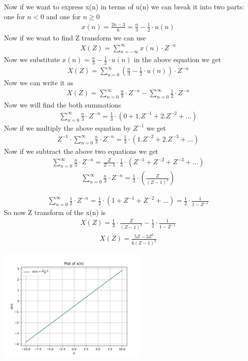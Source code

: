 \documentclass[journal,12pt,twocolumn]{IEEEtran}
\theoremstyle{remark}
\begin{document}
Now if we want to express x(n) in terms of u(n) we can break it into two parts: one for $n < 0 $ and one for $ n \ge 0$  
\begin{align} x(n) = \frac{2n-3}{6} = \frac{n}{3} - \frac{1}{2} \cdot u(n) \end{align}
\bigskip
Now if we want to find Z transform we can use
\begin{align} X(Z) = \sum_{n = -\infty}^{\infty} x(n) \cdot Z^{-n} \end{align}
\bigskip
Now we substitute
$x(n) = \frac{n}{3} - \frac{1}{2} \cdot u(n)$ in the above equation we get
\begin{align} X(Z) = \sum_{n = 0}^{\infty} (\frac{n}{3} - \frac{1}{2} \cdot u(n) )\cdot Z^{-n} \end{align}
\bigskip
Now we can write it as
\begin{align} X(Z) = \sum_{n=0}^{\infty} \frac{n}{3} \cdot Z^{-n} - \sum_{n=0}^{\infty} \frac{1}{2} \cdot Z^{-n} \end{align}
\bigskip
Now we will find the both summations
\begin{align} \sum_{n=0}^{\infty} \frac{n}{3} \cdot Z^{-n} = \frac{1}{3} \cdot (0 + 1.Z^{-1} + 2.Z^{-2} + \ldots) \end{align}
\bigskip
Now if we multiply the above equation by $Z^{-1}$ we get
\begin{align} Z^{-1} \cdot \sum_{n=0}^{\infty} \frac{n}{3} \cdot Z^{-n} =\frac{1}{3} \cdot (1.Z^{-2} + 2.Z^{-3} + \ldots ) \end{align}
\bigskip
Now if we subtract the above two equations we get
\begin{align} \sum_{n=0}^{\infty} \frac{n}{3} \cdot Z^{-n} = \frac{Z}{Z-1} \cdot \frac{1}{3} \cdot (Z^{-1} + Z^{-2} + Z^{-3} + \ldots) \end{align}
\begin{align} \sum_{n=0}^{\infty} \frac{n}{3} \cdot Z^{-n} = \frac{1}{3} \cdot \left(\frac{Z}{(Z-1)^{2}}\right) \end{align}
\newpage

\begin{align} \sum_{n=0}^{\infty} \frac{1}{2} \cdot Z^{-n} = \frac{1}{2} \cdot (1+Z^{-1} + Z^{-2} + \ldots) = \frac{1}{2} \cdot \frac{1}{1- Z^{-1}} \end{align}
So now Z transform of the x(n) is
\begin{align} X(Z) = \frac{1}{3} \cdot \frac{Z}{(Z-1)^{2}} - \frac{1}{2} \cdot \frac{1}{1-Z^{-1}} \end{align}
\begin{align} X(Z) = {\frac{5Z-3 Z^{2}}{6(Z-1)^{2}}} \end{align}

\includegraphics[width=0.55\textwidth]{figs/graphgvv1.jpg}
\end{document}
